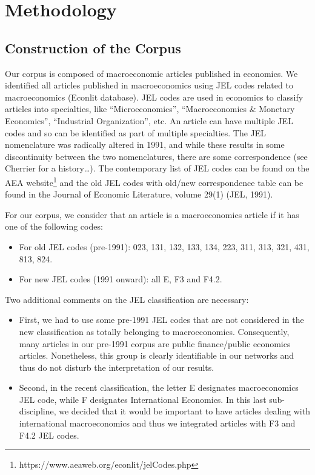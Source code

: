 \documentclass[JEL]{AEA}
\begin{document}
\section{Methodology}

\subsection{Construction of the Corpus}

Our corpus is composed of macroeconomic articles published in economics.
We identified all articles published in macroeconomics using JEL codes
related to macroeconomics (Econlit database). JEL codes are used in
economics to classify articles into specialties, like
``Microeconomics'', ``Macroeconomics \& Monetary Economics'',
``Industrial Organization'', etc. An article can have multiple JEL codes
and so can be identified as part of multiple specialties. The JEL
nomenclature was radically altered in 1991, and while these results in
some discontinuity between the two nomenclatures, there are some
correspondence (see Cherrier for a history\ldots). The contemporary list
of JEL codes can be found on the AEA website\footnote{https://www.aeaweb.org/econlit/jelCodes.php}
and the old JEL codes with old/new correspondence table can be found in
the Journal of Economic Literature, volume 29(1) (JEL, 1991).

For our corpus, we consider that an article is a macroeconomics article
if it has one of the following codes:

\begin{itemize}
\item
  For old JEL codes (pre-1991): 023, 131, 132, 133, 134, 223, 311, 313,
  321, 431, 813, 824.
\item
  For new JEL codes (1991 onward): all E, F3 and F4.2.
\end{itemize}

Two additional comments on the JEL classification are necessary:

\begin{itemize}
\item
  First, we had to use some pre-1991 JEL codes that are not considered
  in the new classification as totally belonging to macroeconomics.
  Consequently, many articles in our pre-1991 corpus are public
  finance/public economics articles. Nonetheless, this group is clearly
  identifiable in our networks and thus do not disturb the
  interpretation of our results.
\item
  Second, in the recent classification, the letter E designates
  macroeconomics JEL code, while F designates International Economics.
  In this last sub-discipline, we decided that it would be important to
  have articles dealing with international macroeconomics and thus we
  integrated articles with F3 and F4.2 JEL codes.
\end{itemize}
\end{document}
